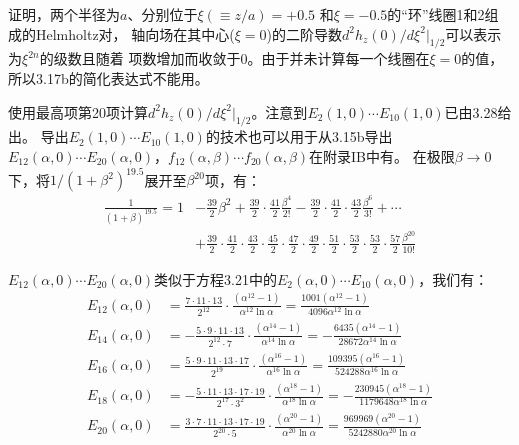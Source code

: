 证明，两个半径为$a$、分别位于$\xi(\equiv z/a)=+0.5$ 和$\xi=−0.5$的“环”线圈1和2组成的Helmholtz对，
轴向场在其中心($\xi=0$)的二阶导数$d^2 h_z(0)/d\xi^2|_{1/2}$可以表示为$\xi^{2n}$的级数且随着
项数增加而收敛于0。由于并未计算每一个线圈在$\xi=0$的值，所以3.17b的简化表达式不能用。


使用最高项第20项计算$d^2 h_z(0)/d\xi^2|_{1/2}$。注意到$E_2(1, 0)\cdots E_{10}(1, 0)$已由3.28给出。
导出$E_2(1, 0)\cdots E_{10}(1, 0)$的技术也可以用于从3.15b导出$E_{12}(\alpha, 0)\cdots E_{20}(\alpha, 0)$，$f_{12}(\alpha,\beta)\cdots f_{20}(\alpha,\beta)$在附录IB中有。
在极限$\beta\rightarrow 0$下，将$1/(1+\beta^2)^{19.5}$展开至$\beta^{20}$项，有：
\begin{equation}%
\begin{split}
\frac{1}{(1+\beta)^{19.5}}=1&-\frac{39}{2}\beta^2+\frac{39}{2}\cdot\frac{41}{2}\frac{\beta^4}{2!}-\frac{39}{2}\cdot\frac{41}{2}\cdot\frac{43}{2}\frac{\beta^6}{3!}+\cdots\\
&+\frac{39}{2}\cdot\frac{41}{2}\cdot\frac{43}{2}\cdot\frac{45}{2}\cdot\frac{47}{2}\cdot\frac{49}{2}\cdot\frac{51}{2}\cdot\frac{53}{2}
\cdot\frac{53}{2}\cdot\frac{57}{2}\frac{\beta^{20}}{10!}
\end{split}
\end{equation}

$E_{12}(\alpha, 0)\cdots E_{20}(\alpha, 0)$类似于方程3.21中的$E_{2}(\alpha, 0)\cdots E_{10}(\alpha, 0)$，我们有：
\begin{subequations}%
	\begin{align}
E_{12}(\alpha,0)&=\frac{7\cdot11\cdot13}{2^{12}}\cdot\frac{(\alpha^{12}-1)}{\alpha^{12}\ln\alpha}=\frac{1001(\alpha^{12}-1)}{4096\alpha^{12}\ln\alpha}\\
E_{14}(\alpha,0)&=-\frac{5\cdot9\cdot11\cdot13}{2^{12}\cdot7}\cdot\frac{(\alpha^{14}-1)}{\alpha^{14}\ln\alpha}=-\frac{6435(\alpha^{14}-1)}{28672\alpha^{14}\ln\alpha}\\
E_{16}(\alpha,0)&=\frac{5\cdot9\cdot11\cdot13\cdot17}{2^{19}}\cdot\frac{(\alpha^{16}-1)}{\alpha^{16}\ln\alpha}=\frac{109395(\alpha^{16}-1)}{524288\alpha^{16}\ln\alpha}\\
E_{18}(\alpha,0)&=-\frac{5\cdot11\cdot13\cdot17\cdot19}{2^{17}\cdot3^2}\cdot\frac{(\alpha^{18}-1)}{\alpha^{18}\ln\alpha}=-\frac{230945(\alpha^{18}-1)}{1179648\alpha^{18}\ln\alpha}\\
E_{20}(\alpha,0)&=\frac{3\cdot7\cdot11\cdot13\cdot17\cdot19}{2^{20}\cdot5}\cdot\frac{(\alpha^{20}-1)}{\alpha^{20}\ln\alpha}=\frac{969969(\alpha^{20}-1)}{5242880\alpha^{20}\ln\alpha}
\end{align}
\end{subequations}

